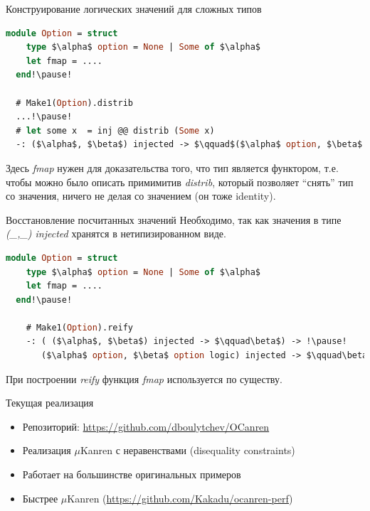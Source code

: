 \documentclass[10pt, mathserif]{beamer}
\theoremstyle{definition}
\begin{document}
\begin{frame}[fragile]{Конструирование логических значений для сложных типов}
  \begin{lstlisting}[language=ml,mathescape=true]
  module Option = struct
    type $\alpha$ option = None | Some of $\alpha$
    let fmap = ....
  end!\pause!

  # Make1(Option).distrib
  ...!\pause!
  # let some x  = inj @@ distrib (Some x)
  -: ($\alpha$, $\beta$) injected -> $\qquad$($\alpha$ option, $\beta$ option logic) injected
  \end{lstlisting}
  \pause

  Здесь \emph{fmap} нужен для доказательства того, что тип является функтором, т.е.
  чтобы можно было описать примимитив \emph{distrib}, который позволяет ``снять'' 
  тип со значения, ничего не делая со значением (он тоже identity).

\end{frame}

\begin{frame}[fragile]{Восстановление посчитанных значений}
  Необходимо, так как значения в типе \emph{(\_,\_) injected} хранятся в
  нетипизированном виде.

  \begin{lstlisting}[language=ml,mathescape=true]
  module Option = struct
    type $\alpha$ option = None | Some of $\alpha$
    let fmap = ....
  end!\pause!

    # Make1(Option).reify
    -: ( ($\alpha$, $\beta$) injected -> $\qquad\beta$) -> !\pause!
       ($\alpha$ option, $\beta$ option logic) injected -> $\qquad\beta$ option logic

  \end{lstlisting}

  При построении \emph{reify} функция \emph{fmap} используется по существу.
\end{frame}

\begin{frame}[fragile]{Текущая реализация}
\begin{itemize}
\item Репозиторий: \url{https://github.com/dboulytchev/OCanren}
\item Реализация $\mu$Kanren с неравенствами (disequality constraints)
\item Работает на большинстве оригинальных примеров
\item Быстрее $\mu$Kanren (\url{https://github.com/Kakadu/ocanren-perf})
\end{itemize}
\end{frame}
\end{document}
